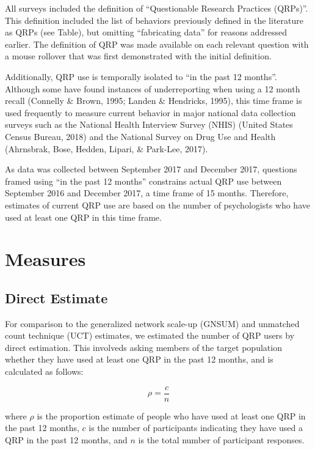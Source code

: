 \documentclass[man]{apa6}
\theoremstyle{definition}
\theoremstyle{definition}
\theoremstyle{definition}
\theoremstyle{remark}
\begin{document}
All surveys included the definition of \enquote{Questionable Research
Practices (QRPs)}. This definition included the list of behaviors
previously defined in the literature as QRPs (see Table), but omitting
\enquote{fabricating data} for reasons addressed earlier. The definition
of QRP was made available on each relevant question with a mouse
rollover that was first demonstrated with the initial definition.

Additionally, QRP use is temporally isolated to \enquote{in the past 12
months}. Although some have found instances of underreporting when using
a 12 month recall (Connelly \& Brown, 1995; Landen \& Hendricks, 1995),
this time frame is used frequently to measure current behavior in major
national data collection surveys such as the National Health Interview
Survey (NHIS) (United States Census Bureau, 2018) and the National
Survey on Drug Use and Health (Ahrnsbrak, Bose, Hedden, Lipari, \&
Park-Lee, 2017).

As data was collected between September 2017 and December 2017,
questions framed using \enquote{in the past 12 months} constrains actual
QRP use between September 2016 and December 2017, a time frame of 15
months. Therefore, estimates of current QRP use are based on the number
of psychologists who have used at least one QRP in this time frame.

\section{Measures}\label{measures}

\subsection{Direct Estimate}\label{direct-estimate}

For comparison to the generalized network scale-up (GNSUM) and unmatched
count technique (UCT) estimates, we estimated the number of QRP users by
direct estimation. This involveds asking members of the target
population whether they have used at least one QRP in the past 12
months, and is calculated as follows:

\begin{equation}
\rho = \frac{c}{n}
\end{equation}

where \(\rho\) is the proportion estimate of people who have used at
least one QRP in the past 12 months, \(c\) is the number of participants
indicating they have used a QRP in the past 12 months, and \(n\) is the
total number of participant responses.
\end{document}
